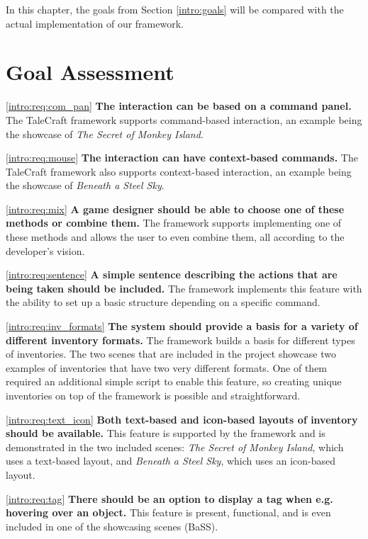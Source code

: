 In this chapter, the goals from Section \ref{intro:goals} will be compared with the actual implementation of our framework.


\section{Goal Assessment}

\hspace{0.5 cm} \ref{intro:req:com_pan} \quad \textbf{The interaction can be based on a command panel.} The TaleCraft framework supports command-based interaction, an example being the showcase of \textit{The Secret of Monkey Island}.

\ref{intro:req:mouse} \quad  \textbf{The interaction can have context-based commands. } The TaleCraft framework also supports context-based interaction, an example being the showcase of \textit{Beneath a Steel Sky}.

\ref{intro:req:mix} \quad  \textbf{A game designer should be able to choose one of these methods or combine them.} The framework supports implementing one of these methods and allows the user to even combine them, all according to the developer's vision.

\ref{intro:req:sentence} \quad  \textbf{A simple sentence describing the actions that are being taken should be included.} The framework implements this feature with the ability to set up a basic structure depending on a specific command.

\ref{intro:req:inv_formats} \quad  \textbf{The system should provide a basis for a variety of different inventory formats.} The framework builds a basis for different types of inventories. The two scenes that are included in the project showcase two examples of inventories that have two very different formats. One of them required an additional simple script to enable this feature, so creating unique inventories on top of the framework is possible and straightforward.

\ref{intro:req:text_icon} \quad  \textbf{Both text-based and icon-based layouts of inventory should be available.} This feature is supported by the framework and is demonstrated in the two included scenes: \textit{The Secret of Monkey Island}, which uses a text-based layout, and \textit{Beneath a Steel Sky}, which uses an icon-based layout. 

\ref{intro:req:tag} \quad  \textbf{There should be an option to display a tag when e.g. hovering over an object.} This feature is present, functional, and is even included in one of the showcasing scenes (BaSS).

